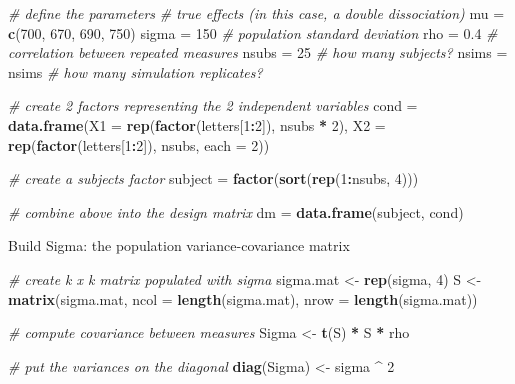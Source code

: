 \documentclass[]{book}
\newenvironment{Shaded}{\begin{snugshade}}{\end{snugshade}}
\newcommand{\CommentTok}[1]{\textcolor[rgb]{0.56,0.35,0.01}{\textit{#1}}}
\newcommand{\DataTypeTok}[1]{\textcolor[rgb]{0.13,0.29,0.53}{#1}}
\newcommand{\DecValTok}[1]{\textcolor[rgb]{0.00,0.00,0.81}{#1}}
\newcommand{\FloatTok}[1]{\textcolor[rgb]{0.00,0.00,0.81}{#1}}
\newcommand{\KeywordTok}[1]{\textcolor[rgb]{0.13,0.29,0.53}{\textbf{#1}}}
\newcommand{\NormalTok}[1]{#1}
\newcommand{\OperatorTok}[1]{\textcolor[rgb]{0.81,0.36,0.00}{\textbf{#1}}}
\newcommand{\StringTok}[1]{\textcolor[rgb]{0.31,0.60,0.02}{#1}}
\begin{document}
\begin{Shaded}
\begin{Highlighting}[]
\CommentTok{# define the parameters}
\CommentTok{# true effects (in this case, a double dissociation)}
\NormalTok{mu =}\StringTok{ }\KeywordTok{c}\NormalTok{(}\DecValTok{700}\NormalTok{, }\DecValTok{670}\NormalTok{, }\DecValTok{690}\NormalTok{, }\DecValTok{750}\NormalTok{) }
\NormalTok{sigma =}\StringTok{ }\DecValTok{150}  \CommentTok{# population standard deviation}
\NormalTok{rho =}\StringTok{ }\FloatTok{0.4} \CommentTok{# correlation between repeated measures}
\NormalTok{nsubs =}\StringTok{ }\DecValTok{25} \CommentTok{# how many subjects?}
\NormalTok{nsims =}\StringTok{ }\NormalTok{nsims }\CommentTok{# how many simulation replicates?}
 
\CommentTok{# create 2 factors representing the 2 independent variables}
\NormalTok{cond =}\StringTok{ }\KeywordTok{data.frame}\NormalTok{(}\DataTypeTok{X1 =} \KeywordTok{rep}\NormalTok{(}\KeywordTok{factor}\NormalTok{(letters[}\DecValTok{1}\OperatorTok{:}\DecValTok{2}\NormalTok{]), nsubs }\OperatorTok{*}\StringTok{ }\DecValTok{2}\NormalTok{),}
\DataTypeTok{X2 =} \KeywordTok{rep}\NormalTok{(}\KeywordTok{factor}\NormalTok{(letters[}\DecValTok{1}\OperatorTok{:}\DecValTok{2}\NormalTok{]), nsubs, }\DataTypeTok{each =} \DecValTok{2}\NormalTok{))}
 
\CommentTok{# create a subjects factor}
\NormalTok{subject =}\StringTok{ }\KeywordTok{factor}\NormalTok{(}\KeywordTok{sort}\NormalTok{(}\KeywordTok{rep}\NormalTok{(}\DecValTok{1}\OperatorTok{:}\NormalTok{nsubs, }\DecValTok{4}\NormalTok{)))}
 
\CommentTok{# combine above into the design matrix}
\NormalTok{dm =}\StringTok{ }\KeywordTok{data.frame}\NormalTok{(subject, cond)}
\end{Highlighting}
\end{Shaded}

Build Sigma: the population variance-covariance matrix

\begin{Shaded}
\begin{Highlighting}[]
\CommentTok{# create k x k matrix populated with sigma}
\NormalTok{sigma.mat <-}\StringTok{ }\KeywordTok{rep}\NormalTok{(sigma, }\DecValTok{4}\NormalTok{)}
\NormalTok{S <-}
\KeywordTok{matrix}\NormalTok{(sigma.mat,}
\DataTypeTok{ncol =} \KeywordTok{length}\NormalTok{(sigma.mat),}
\DataTypeTok{nrow =} \KeywordTok{length}\NormalTok{(sigma.mat))}

\CommentTok{# compute covariance between measures}
\NormalTok{Sigma <-}\StringTok{ }\KeywordTok{t}\NormalTok{(S) }\OperatorTok{*}\StringTok{ }\NormalTok{S }\OperatorTok{*}\StringTok{ }\NormalTok{rho}

\CommentTok{# put the variances on the diagonal}
\KeywordTok{diag}\NormalTok{(Sigma) <-}\StringTok{ }\NormalTok{sigma }\OperatorTok{^}\StringTok{ }\DecValTok{2}  
\end{Highlighting}
\end{Shaded}
\end{document}
